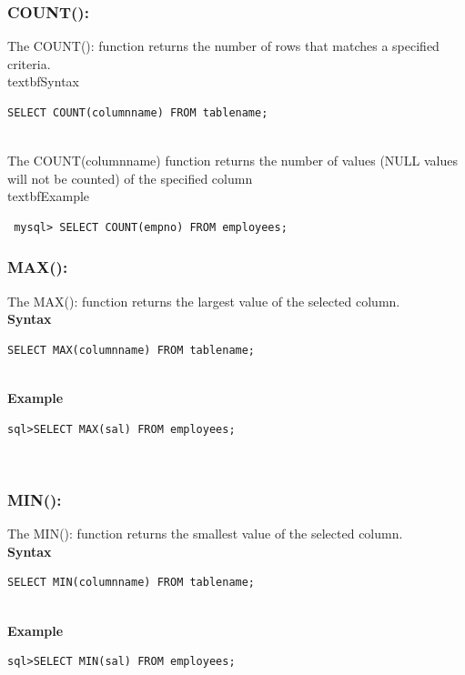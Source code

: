 \documentclass[11pt,a4paper]{article}
\begin{document}
\subsubsection*{COUNT():} The COUNT(): function returns the number of rows that matches a specified criteria.\\

textbf{Syntax}\\
\begin{verbatim}SELECT COUNT(columnname) FROM tablename; \end{verbatim}\\
The COUNT(columnname) function returns the number of values (NULL values will not be counted) of the specified column\\

textbf{Example}
\begin{verbatim} mysql> SELECT COUNT(empno) FROM employees; \end{verbatim}

\subsubsection*{MAX():} The MAX(): function returns the largest value of the selected column.\\

\textbf{Syntax}\\
\begin{verbatim}SELECT MAX(columnname) FROM tablename; \end{verbatim}\\

\textbf{Example}
\begin{verbatim}sql>SELECT MAX(sal) FROM employees; \end{verbatim}\\

\subsubsection*{MIN():} The MIN(): function returns the smallest value of the selected column.\\

\textbf{Syntax}\\
\begin{verbatim}SELECT MIN(columnname) FROM tablename; \end{verbatim}\\

\textbf{Example}
\begin{verbatim}sql>SELECT MIN(sal) FROM employees; \end{verbatim}\\
\end{document}
